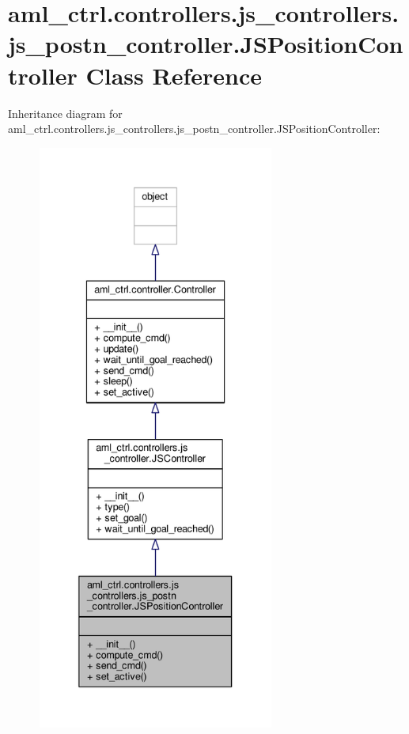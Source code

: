 \hypertarget{classaml__ctrl_1_1controllers_1_1js__controllers_1_1js__postn__controller_1_1_j_s_position_controller}{\section{aml\-\_\-ctrl.\-controllers.\-js\-\_\-controllers.\-js\-\_\-postn\-\_\-controller.\-J\-S\-Position\-Controller Class Reference}
\label{classaml__ctrl_1_1controllers_1_1js__controllers_1_1js__postn__controller_1_1_j_s_position_controller}
}


Inheritance diagram for aml\-\_\-ctrl.\-controllers.\-js\-\_\-controllers.\-js\-\_\-postn\-\_\-controller.\-J\-S\-Position\-Controller\-:\nopagebreak
\begin{figure}[H]
\begin{center}
\leavevmode
\includegraphics[height=550pt]{classaml__ctrl_1_1controllers_1_1js__controllers_1_1js__postn__controller_1_1_j_s_position_controller__inherit__graph}
\end{center}
\end{figure}


